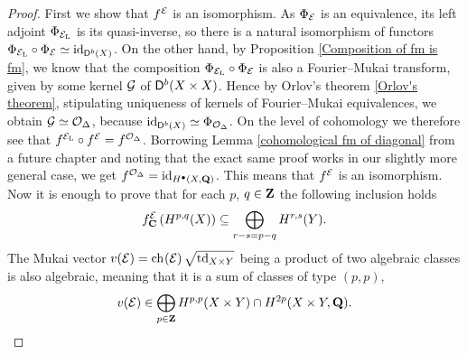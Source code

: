 \begin{proof}
    First we show that $f^{\mathcal E}$ is an isomorphism. As $\Phi_{\mathcal E}$ is an equivalence, its left adjoint $\Phi_{\mathcal E_\mathrm{L}}$ is its quasi-inverse, so there is a natural isomorphism of functors $\Phi_{\mathcal E_\mathrm{L}} \circ \Phi_{\mathcal E} \simeq \operatorname{id}_{\mathsf{D}^b(X)}$. On the other hand, by Proposition \ref{Composition of fm is fm}, we know that the composition $\Phi_{\mathcal E_\mathrm{L}} \circ \Phi_{\mathcal E}$ is also a Fourier--Mukai transform, given by some kernel $\mathcal G$ of $\mathsf{D}^b(X \times X)$. Hence by Orlov's theorem \ref{Orlov's theorem}, stipulating uniqueness of kernels of Fourier--Mukai equivalences, we obtain $\mathcal G \simeq {\mathcal{O}_{\Delta}}$, because $\operatorname{id}_{\mathsf{D}^b(X)} \simeq \Phi_{{\mathcal{O}_{\Delta}}}$. On the level of cohomology we therefore see that $f^{\mathcal E_\mathrm{L}} \circ f^{\mathcal E} = f^{{\mathcal{O}_{\Delta}}}$. Borrowing Lemma \ref{cohomological fm of diagonal} from a future chapter and noting that the exact same proof works in our slightly more general case, we get $f^{{\mathcal{O}_{\Delta}}} = \operatorname{id}_{H^{\bullet}(X, \mathbf Q)}$. This means that $f^{\mathcal E}$ is an isomorphism.
    Now it is enough to prove that for each $p$, $q \in \mathbf Z$ the following inclusion holds
    \begin{equation}
        \label{eq: Hodge lattice, fm transform}
        f^{\mathcal E}_\mathbf C\left(H^{p,q}(X)\right) \subseteq \bigoplus_{r - s = p - q} H^{r,s}(Y).
    \end{equation}
    The Mukai vector $v(\E) = \ch[]{\E}\sqrt{\tdclass{X \times Y}}$ being a product of two algebraic classes is also algebraic, meaning that it is a sum of classes of type $(p,p)$, \ie
    \[
        v(\mathcal E) \in \bigoplus_{p \in \mathbf Z} H^{p,p}(X \times Y) \cap H^{2p}(X \times Y, \mathbf Q).
    \] 

\end{proof}
